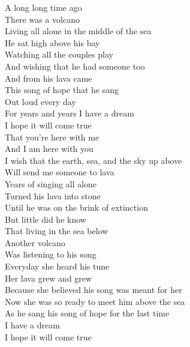 \begin{flushleft}
A long long time ago\\
There was a volcano\\
Living all alone in the middle of the sea\\
He sat high above his bay\\
Watching all the couples play\\
And wishing that he had someone too\\
And from his lava came\\
This song of hope that he sang \\
Out loud every day\\
For years and years
\hops
\hspace{0.9cm}I have a dream\\
\hspace{0.9cm}I hope it will come true\\
\hspace{0.9cm}That you're here with me\\
\hspace{0.9cm}And I am here with you\\
\hspace{0.9cm}I wish that the earth, sea, and the sky up above\\
\hspace{0.9cm}Will send me someone to lava\\
\hops
Years of singing all alone\\
Turned his lava into stone\\
Until he was on the brink of extinction\\
But little did he know\\
That living in the sea below\\
Another volcano\\
Was listening to his song\\
Everyday she heard his tune\\
Her lava grew and grew\\
Because she believed his song was meant for her\\
Now she was so ready to meet him above the sea\\
As he sang his song of hope for the last time\\
\hops
\hspace{0.9cm}I have a dream\\
\hspace{0.9cm}I hope it will come true\\

\end{flushleft}
